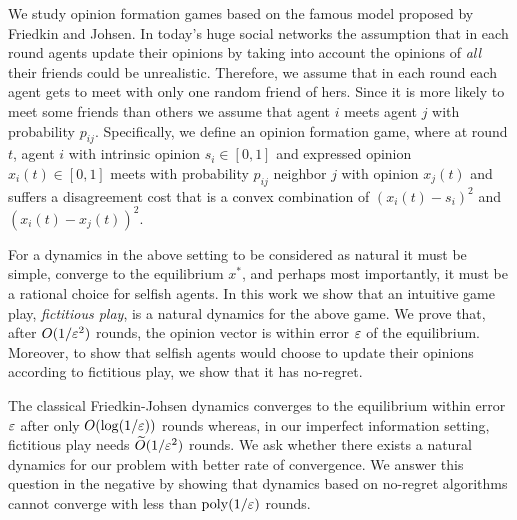 We study opinion formation games based on the famous model proposed by Friedkin
and Johsen.  In today's huge social networks the assumption that in each round
agents update their opinions by taking into account the opinions of
\emph{all} their friends could be unrealistic. Therefore, we assume that in
each round each agent gets to meet with only one random friend of
hers.  Since it is more likely to meet some friends than others we assume
that agent $i$ meets agent $j$ with probability $p_{ij}$.
Specifically, we define an opinion formation game, where at round $t$,
agent $i$ with intrinsic opinion $s_i\in[0,1]$ and expressed opinion $x_i(t)
\in[0,1]$ meets with probability $p_{ij}$ neighbor $j$ with opinion $x_j(t)$
and suffers a disagreement cost that is a convex combination of
$(x_i(t) - s_i)^2$ and $(x_i(t) - x_j(t))^2$.


For a dynamics in the above setting to be considered as natural it must be
simple, converge to the equilibrium $x^*$, and perhaps most importantly, it
must be a rational choice for selfish agents.  In this work we show that
an intuitive game play, \emph{fictitious play}, is a natural dynamics for
the above game.  We prove that, after $O(1/\varepsilon^2)$ rounds, the opinion vector
is within error $\varepsilon$  of the equilibrium. Moreover, to show that selfish
agents would choose to update their opinions according to fictitious play, we
show that it has no-regret.


The classical Friedkin-Johsen dynamics converges to the equilibrium within
error $\varepsilon$ after only $O(\log(1/\varepsilon))$ rounds whereas, in our imperfect
information setting, fictitious play needs $\widetilde{O}(1/\varepsilon^2)$ rounds.
We ask whether there exists a natural dynamics for our problem
with better rate of convergence.  We answer this question in the negative
by showing that dynamics based on no-regret algorithms cannot converge with
less than $\mathrm{poly}(1/\varepsilon)$ rounds.
